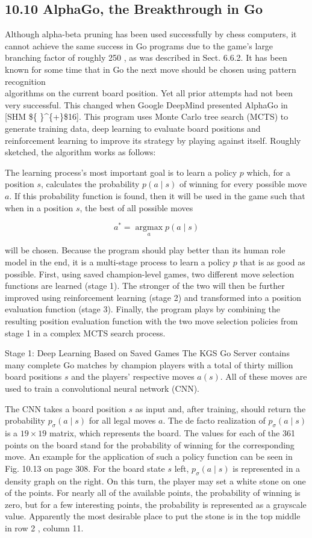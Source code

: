 \documentclass[10pt]{article}
\begin{document}
\subsection*{10.10 AlphaGo, the Breakthrough in Go}
Although alpha-beta pruning has been used successfully by chess computers, it cannot achieve the same success in Go programs due to the game's large branching factor of roughly 250 , as was described in Sect. 6.6.2. It has been known for some time that in Go the next move should be chosen using pattern recognition\\[0pt]
algorithms on the current board position. Yet all prior attempts had not been very successful. This changed when Google DeepMind presented AlphaGo in [SHM \$\{ \}\^{}\{+\}\$16]. This program uses Monte Carlo tree search (MCTS) to generate training data, deep learning to evaluate board positions and reinforcement learning to improve its strategy by playing against itself. Roughly sketched, the algorithm works as follows:

The learning process's most important goal is to learn a policy $p$ which, for a position $s$, calculates the probability $p(a \mid s)$ of winning for every possible move $a$. If this probability function is found, then it will be used in the game such that when in a position $s$, the best of all possible moves

$$
a^{*}=\underset{a}{\operatorname{argmax}} p(a \mid s)
$$

will be chosen. Because the program should play better than its human role model in the end, it is a multi-stage process to learn a policy $p$ that is as good as possible. First, using saved champion-level games, two different move selection functions are learned (stage 1). The stronger of the two will then be further improved using reinforcement learning (stage 2) and transformed into a position evaluation function (stage 3). Finally, the program plays by combining the resulting position evaluation function with the two move selection policies from stage 1 in a complex MCTS search process.

Stage 1: Deep Learning Based on Saved Games The KGS Go Server contains many complete Go matches by champion players with a total of thirty million board positions $s$ and the players' respective moves $a(s)$. All of these moves are used to train a convolutional neural network (CNN).

The CNN takes a board position $s$ as input and, after training, should return the probability $p_{\sigma}(a \mid s)$ for all legal moves $a$. The de facto realization of $p_{\sigma}(a \mid s)$ is a $19 \times 19$ matrix, which represents the board. The values for each of the 361 points on the board stand for the probability of winning for the corresponding move. An example for the application of such a policy function can be seen in Fig. 10.13 on page 308. For the board state $s$ left, $p_{\sigma}(a \mid s)$ is represented in a density graph on the right. On this turn, the player may set a white stone on one of the points. For nearly all of the available points, the probability of winning is zero, but for a few interesting points, the probability is represented as a grayscale value. Apparently the most desirable place to put the stone is in the top middle in row 2 , column 11.
\end{document}
